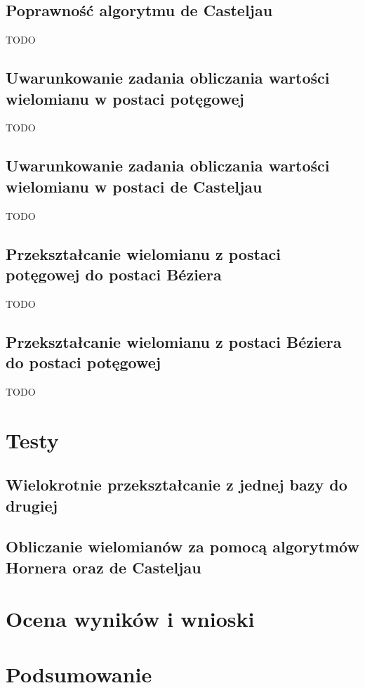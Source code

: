 \documentclass[wide, 11pt]{mwart}
\begin{document}
\subsection{Poprawność algorytmu de Casteljau}
TODO

\subsection{Uwarunkowanie zadania obliczania wartości wielomianu w postaci potęgowej}
TODO

\subsection{Uwarunkowanie zadania obliczania wartości wielomianu w postaci de Casteljau}
TODO

\subsection{Przekształcanie wielomianu z postaci potęgowej do postaci Béziera}
TODO

\subsection{Przekształcanie wielomianu z postaci Béziera do postaci potęgowej}
TODO

\section{Testy}

\subsection{Wielokrotnie przekształcanie z jednej bazy do drugiej}

\subsection{Obliczanie wielomianów za pomocą algorytmów Hornera oraz de Casteljau}

\section{Ocena wyników i wnioski}

\section{Podsumowanie}
\end{document}
